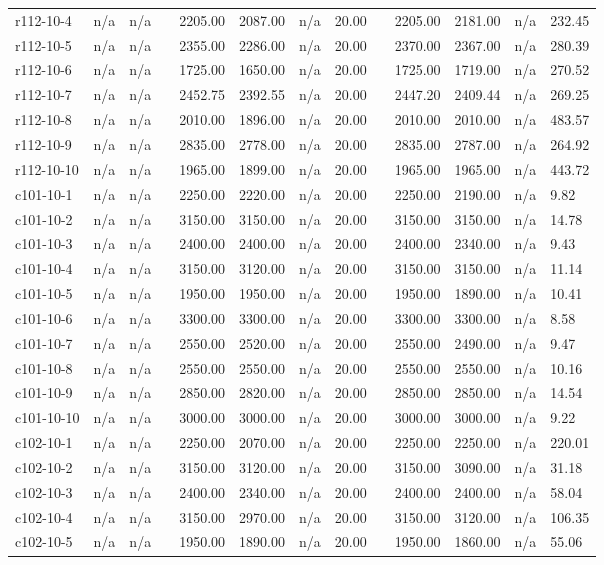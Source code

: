 \documentclass[final,5p,times,twocolumn]{elsarticle}
\begin{document}
{{{{{{{{{{{{{\begin{longtable}{l l l l l l l l l l l l l}
r112-10-4& n/a& n/a&&2205.00& 2087.00& n/a& 20.00&&2205.00& 2181.00& n/a& 232.45\\
r112-10-5& n/a& n/a&&2355.00& 2286.00& n/a& 20.00&&2370.00& 2367.00& n/a& 280.39\\
r112-10-6& n/a& n/a&&1725.00& 1650.00& n/a& 20.00&&1725.00& 1719.00& n/a& 270.52\\
r112-10-7& n/a& n/a&&2452.75& 2392.55& n/a& 20.00&&2447.20& 2409.44& n/a& 269.25\\
r112-10-8& n/a& n/a&&2010.00& 1896.00& n/a& 20.00&&2010.00& 2010.00& n/a& 483.57\\
r112-10-9& n/a& n/a&&2835.00& 2778.00& n/a& 20.00&&2835.00& 2787.00& n/a& 264.92\\
r112-10-10& n/a& n/a&&1965.00& 1899.00& n/a& 20.00&&1965.00& 1965.00& n/a& 443.72\\
c101-10-1& n/a& n/a&&2250.00& 2220.00& n/a& 20.00&&2250.00& 2190.00& n/a& 9.82\\
c101-10-2& n/a& n/a&&3150.00& 3150.00& n/a& 20.00&&3150.00& 3150.00& n/a& 14.78\\
c101-10-3& n/a& n/a&&2400.00& 2400.00& n/a& 20.00&&2400.00& 2340.00& n/a& 9.43\\
c101-10-4& n/a& n/a&&3150.00& 3120.00& n/a& 20.00&&3150.00& 3150.00& n/a& 11.14\\
c101-10-5& n/a& n/a&&1950.00& 1950.00& n/a& 20.00&&1950.00& 1890.00& n/a& 10.41\\
c101-10-6& n/a& n/a&&3300.00& 3300.00& n/a& 20.00&&3300.00& 3300.00& n/a& 8.58\\
c101-10-7& n/a& n/a&&2550.00& 2520.00& n/a& 20.00&&2550.00& 2490.00& n/a& 9.47\\
c101-10-8& n/a& n/a&&2550.00& 2550.00& n/a& 20.00&&2550.00& 2550.00& n/a& 10.16\\
c101-10-9& n/a& n/a&&2850.00& 2820.00& n/a& 20.00&&2850.00& 2850.00& n/a& 14.54\\
c101-10-10& n/a& n/a&&3000.00& 3000.00& n/a& 20.00&&3000.00& 3000.00& n/a& 9.22\\
c102-10-1& n/a& n/a&&2250.00& 2070.00& n/a& 20.00&&2250.00& 2250.00& n/a& 220.01\\
c102-10-2& n/a& n/a&&3150.00& 3120.00& n/a& 20.00&&3150.00& 3090.00& n/a& 31.18\\
c102-10-3& n/a& n/a&&2400.00& 2340.00& n/a& 20.00&&2400.00& 2400.00& n/a& 58.04\\
c102-10-4& n/a& n/a&&3150.00& 2970.00& n/a& 20.00&&3150.00& 3120.00& n/a& 106.35\\
c102-10-5& n/a& n/a&&1950.00& 1890.00& n/a& 20.00&&1950.00& 1860.00& n/a& 55.06\\

\end{longtable}}}}}}}}}}}}}}
\end{document}
